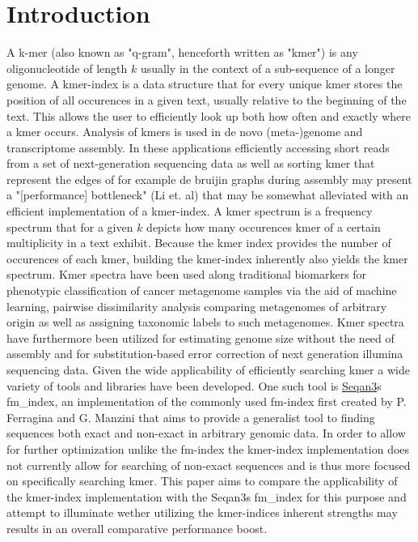 \chapter{Introduction}
A k-mer (also known as "q-gram", henceforth written as "kmer") is any oligonucleotide of length $k$ usually in the
context of a sub-sequence of a longer genome. A kmer-index is a data structure that for every unique kmer
stores the position of all occurences in a given text, usually relative to the beginning of the text.
This allows the user to efficiently look up both how often and exactly where a kmer occurs.
Analysis of kmers is used in de novo (meta-)genome\cite{megahit} and transcriptome\cite{SOAPdenovo-Trans} assembly.
In these applications efficiently accessing short reads from a set of next-generation sequencing data as well as sorting
kmer that represent the edges of for example de bruijin graphs during assembly may present a
"[performance] bottleneck" (Li et. al) that may be somewhat alleviated with an efficient implementation of a kmer-index.
\newline
A kmer spectrum is a frequency spectrum that for a given $k$ depicts how many occurences kmer of a certain multiplicity in a text
exhibit. %
Because the kmer index provides the number of occurences of each kmer, building the kmer-index inherently also yields
the kmer spectrum. Kmer spectra have been used along traditional biomarkers for phenotypic classification of cancer
metagenome samples via the aid of machine learning\cite{phenotype:classification:with:kmer:spectrum}, pairwise dissimilarity
analysis comparing metagenomes of arbitrary origin\cite{kmer:spectrum:dissimilarity} as well as assigning taxonomic labels
to such metagenomes\cite{kraken:metagenome:classification}. Kmer spectra have furthermore been utilized for estimating genome
size without the need of assembly\cite{genome:size:estimation} and for substitution-based error correction
of next generation illumina sequencing data\cite{musket:kmer:spectrum:error:correction}.
\newline
Given the wide applicability of efficiently searching kmer a wide variety of tools and libraries have been developed.
One such tool is \href{https://github.com/seqan/seqan3}{Seqan3}s fm\_index\cite{fm:index:master:thesis}, an implementation
of the commonly used fm-index first created by P. Ferragina and G. Manzini\cite{original:fm} that aims to provide a generalist
tool to finding sequences both exact and non-exact in arbitrary genomic data.
In order to allow for further optimization unlike the fm-index the kmer-index implementation does not currently allow for
searching of non-exact sequences and is thus more focused on specifically searching kmer. This paper aims to compare the applicability
of the kmer-index implementation with the Seqan3s fm\_index for this purpose and attempt to illuminate wether utilizing
the kmer-indices inherent strengths may results in an overall comparative performance boost.
